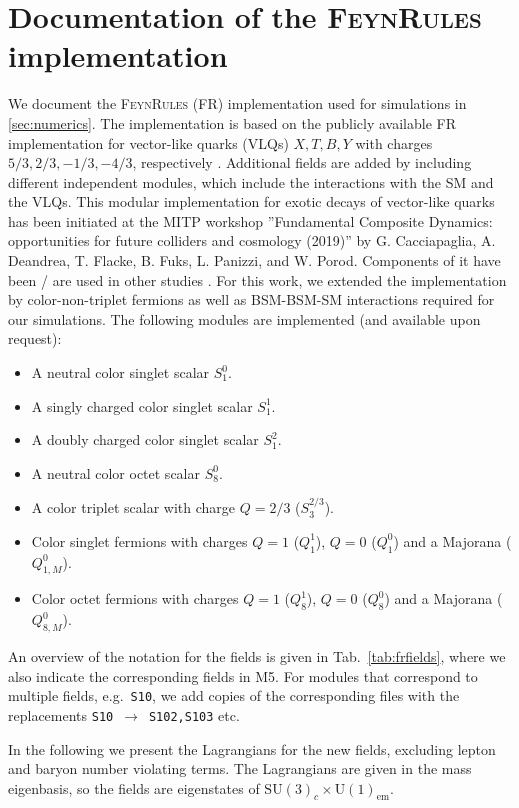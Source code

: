 \documentclass[preprintnumbers,nofootinbib,showpacs,eqsecnum,pre,12pt]{revtex4-1}
\newcommand{\SU}{\text{SU}}
\newcommand{\U}{\text{U}}
\begin{document}
\section{Documentation of the \textsc{FeynRules} implementation}
\label{app:FRimp}

We document the \textsc{FeynRules} (FR) implementation used for simulations in \cref{sec:numerics}. The implementation is based on the publicly available FR implementation for vector-like quarks (VLQs) $X,T,B,Y$ with charges $5/3,2/3,-1/3,-4/3$, respectively \cite{urlFR,Buchkremer:2013bha,Fuks:2016ftf}.
Additional fields are added by including different independent modules, which include the interactions with the SM and the VLQs. This modular implementation for exotic decays of vector-like quarks has been initiated at the MITP workshop ''Fundamental Composite Dynamics: opportunities for future colliders and cosmology (2019)'' by G. Cacciapaglia, A. Deandrea, T. Flacke, B. Fuks, L. Panizzi, and W. Porod. Components of it have been / are used in other studies \cite{Cacciapaglia:2019zmj,Xie:2019gya,Benbrik:2019zdp,Corcella:2021mdl}. For this work, we extended the implementation by color-non-triplet fermions as well as BSM-BSM-SM interactions required for our simulations.
The following modules are implemented (and available upon request): 
\begin{itemize}
	\item A neutral color singlet scalar $S_1^0$. 
	\item A singly charged color singlet scalar $S_1^1$. 
	\item A doubly charged color singlet scalar $S_1^2$. 
	\item A neutral color octet scalar $S^0_8$.  
	\item A color triplet scalar with charge $Q=2/3$ ($S_3^{2/3}$).
	\item Color singlet fermions with charges $Q=1$ ($Q_1^1$), $Q=0$ ($Q^0_1$) and a Majorana ($Q_{1,M}^0$).
	\item Color octet fermions with charges $Q=1$ ($Q_8^1$), $Q=0$ ($Q^0_8$) and a Majorana ($Q_{8,M}^0$).
\end{itemize}
An overview of the notation for the fields is given in Tab.~\ref{tab:frfields}, where we also indicate the corresponding fields in M5.
For modules that correspond to multiple fields, e.g.\ \texttt{S10}, we add copies of the corresponding files with the replacements \texttt{S10}~$\to$~\texttt{S102,S103} etc.

In the following we present the Lagrangians for the new fields, excluding lepton and baryon number violating terms.
The Lagrangians are given in the mass eigenbasis, so the fields are eigenstates of $\SU(3)_c\times\U(1)_\mathrm{em}$.
\end{document}
